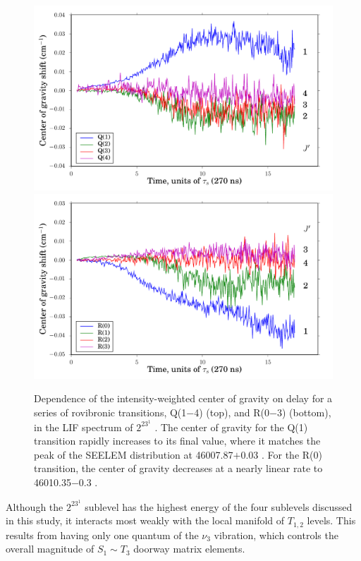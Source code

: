 \documentclass[12pt]{mitthesis}
\begin{document}
\begin{figure}
  \caption{Dependence of the intensity-weighted center of gravity on
    delay for a series of rovibronic transitions, Q(1$-$4) (top), and
    R(0$-$3) (bottom), in the LIF spectrum of $2^23^1$ .  The
    center of gravity for the Q(1) transition rapidly increases to its
    final value, where it matches the peak of the SEELEM distribution
    at 46007.87$+$0.03 \rcm.  For the R(0) transition, the center of
    gravity decreases at a nearly linear rate to 46010.35$-$0.3 \rcm.}
  \label{fig:2231-cog-delay}
  \centering
  \vspace{5mm}
  \includegraphics[width=6in]{2231-q1234-cog-delay.pdf}
  \includegraphics[width=6in]{2231-r0123-cog-delay.pdf}
\end{figure}


Although the $2^23^1$  sublevel has the highest energy of the
four sublevels discussed in this study, it interacts most weakly with
the local manifold of $T_{1,2}$ levels.  This results from having only
one quantum of the $\nu_3$ vibration, which controls the overall
magnitude of $S_1 \sim T_3$ doorway matrix elements.
\end{document}
